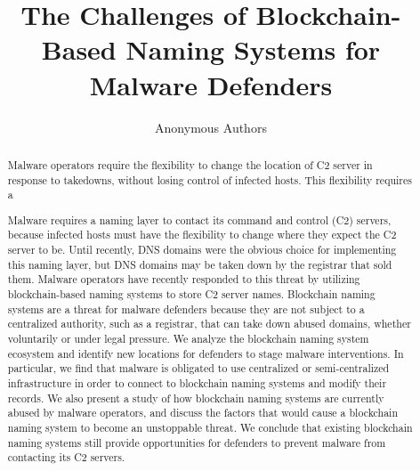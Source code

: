 \documentclass[conference]{IEEEtran}
\begin{document}
\author{Anonymous Authors}

\title{The Challenges of Blockchain-Based Naming Systems for Malware Defenders}



\maketitle
\pagestyle{plain}

\begin{abstract}
	
Malware operators require the flexibility to change the 
location of C2 server in response to takedowns, without 
losing control of infected hosts. This flexibility requires a 

Malware requires a naming layer to contact its command 
and control (C2) servers, because infected hosts must have 
the flexibility to change where they expect the C2 server to 
be. Until recently, DNS domains were the obvious choice for 
implementing this naming layer, 
but DNS domains may be taken down by the registrar that 
sold them. Malware operators have recently responded to 
this threat by utilizing blockchain-based naming systems 
to store C2 server names. Blockchain naming systems are a 
threat for malware defenders because they are not subject 
to a centralized authority, such as a registrar, that can 
take down abused domains, whether voluntarily or under 
legal pressure. We analyze the blockchain naming system 
ecosystem and identify new locations for defenders to 
stage malware interventions. In particular, we find that 
malware is obligated to use centralized or 
semi-centralized infrastructure in order to connect to 
blockchain naming systems and modify their records. We 
also present a study of how blockchain naming systems are 
currently abused by malware operators, and discuss the 
factors that would cause a blockchain naming system to 
become an unstoppable threat. We conclude that
existing blockchain naming systems still provide 
opportunities for defenders to prevent malware from 
contacting its C2 servers.
\end{abstract}
\end{document}
